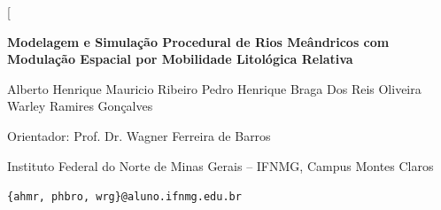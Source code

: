 \documentclass[9pt,a4paper,twocolumn]{extarticle}
\begin{document}
\twocolumn[
\begin{center}
  {\sffamily\bfseries\fontsize{14}{16}\selectfont
   Modelagem e Simulação Procedural de Rios Meândricos com Modulação Espacial por Mobilidade Litológica Relativa\par}
  \vspace{5pt}
  {\fontsize{9.5}{11}\selectfont
   Alberto Henrique Mauricio Ribeiro \quad Pedro Henrique Braga Dos Reis Oliveira \quad Warley Ramires Gonçalves\par}
  \vspace{2pt}
  {\fontsize{8.5}{10}\selectfont
   Orientador: Prof. Dr. Wagner Ferreira de Barros\par
   Instituto Federal do Norte de Minas Gerais -- IFNMG, Campus Montes Claros\par
   \texttt{\{ahmr, phbro, wrg\}@aluno.ifnmg.edu.br}\par}
\end{center}
\vspace{3pt}
\end{document}
